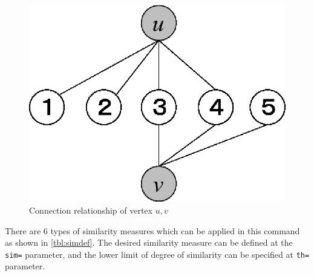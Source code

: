 \begin{figure}[htbp]
\begin{center}

\begin{minipage}{0.3\hsize}
\includegraphics[scale=0.5]{./sim.eps}
\caption{Connection relationship of vertex $u,v$\label{fig:sim}}
\end{minipage}
\end{center}
\end{figure}

There are 6 types of similarity measures which can be applied in this command as shown in \ref{tbl:simdef}. The desired similarity measure can be defined at the \verb|sim=| parameter,  and the lower limit of degree of similarity can be specified at \verb|th=| parameter. 


